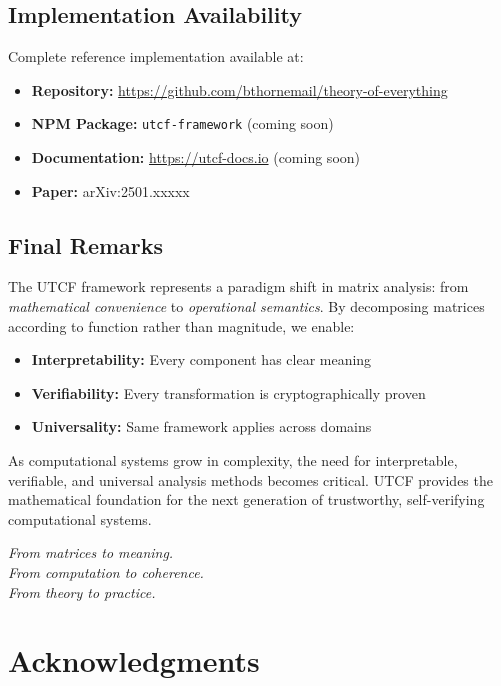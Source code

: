 \documentclass[11pt,a4paper]{article}
\theoremstyle{definition}
\theoremstyle{remark}
\begin{document}
\subsection{Implementation Availability}

Complete reference implementation available at:
\begin{itemize}
\item \textbf{Repository:} \url{https://github.com/bthornemail/theory-of-everything}
\item \textbf{NPM Package:} \texttt{utcf-framework} (coming soon)
\item \textbf{Documentation:} \url{https://utcf-docs.io} (coming soon)
\item \textbf{Paper:} arXiv:2501.xxxxx
\end{itemize}

\subsection{Final Remarks}

The UTCF framework represents a paradigm shift in matrix analysis: from \textit{mathematical convenience} to \textit{operational semantics}. By decomposing matrices according to function rather than magnitude, we enable:

\begin{itemize}
\item \textbf{Interpretability:} Every component has clear meaning
\item \textbf{Verifiability:} Every transformation is cryptographically proven
\item \textbf{Universality:} Same framework applies across domains
\end{itemize}

As computational systems grow in complexity, the need for interpretable, verifiable, and universal analysis methods becomes critical. UTCF provides the mathematical foundation for the next generation of trustworthy, self-verifying computational systems.

\begin{center}
\textit{From matrices to meaning.} \\
\textit{From computation to coherence.} \\
\textit{From theory to practice.}
\end{center}

\section*{Acknowledgments}
\end{document}
